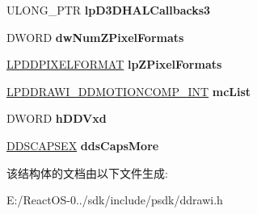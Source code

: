 \begin{DoxyCompactItemize}
\item 
\mbox{\label{struct___d_d_r_a_w_i___d_i_r_e_c_t_d_r_a_w___g_b_l_a2e05df6fe4aae33a03b52f574b7878ac}} 
U\+L\+O\+N\+G\+\_\+\+P\+TR {\bfseries lp\+D3\+D\+H\+A\+L\+Callbacks3}
\item 
\mbox{\label{struct___d_d_r_a_w_i___d_i_r_e_c_t_d_r_a_w___g_b_l_af3b24ccbcff100c01ac05c7971dd1ade}} 
D\+W\+O\+RD {\bfseries dw\+Num\+Z\+Pixel\+Formats}
\item 
\mbox{\label{struct___d_d_r_a_w_i___d_i_r_e_c_t_d_r_a_w___g_b_l_aa7c0ca948e394924854bcca99b753a34}} 
\hyperlink{interfacevoid}{L\+P\+D\+D\+P\+I\+X\+E\+L\+F\+O\+R\+M\+AT} {\bfseries lp\+Z\+Pixel\+Formats}
\item 
\mbox{\label{struct___d_d_r_a_w_i___d_i_r_e_c_t_d_r_a_w___g_b_l_aef4cf06888e4779fcae88e0a73acff5a}} 
\hyperlink{struct___d_d_r_a_w_i___d_d_m_o_t_i_o_n_c_o_m_p___i_n_t}{L\+P\+D\+D\+R\+A\+W\+I\+\_\+\+D\+D\+M\+O\+T\+I\+O\+N\+C\+O\+M\+P\+\_\+\+I\+NT} {\bfseries mc\+List}
\item 
\mbox{\label{struct___d_d_r_a_w_i___d_i_r_e_c_t_d_r_a_w___g_b_l_a18e2bf95b4920198dc0bbc5e585347b9}} 
D\+W\+O\+RD {\bfseries h\+D\+D\+Vxd}
\item 
\mbox{\label{struct___d_d_r_a_w_i___d_i_r_e_c_t_d_r_a_w___g_b_l_a958242d9c1e6f94f9875255ee0c384de}} 
\hyperlink{struct___d_d_s_c_a_p_s_e_x}{D\+D\+S\+C\+A\+P\+S\+EX} {\bfseries dds\+Caps\+More}
\end{DoxyCompactItemize}


该结构体的文档由以下文件生成\+:\begin{DoxyCompactItemize}
\item 
E\+:/\+React\+O\+S-\/0../sdk/include/psdk/ddrawi.\+h\end{DoxyCompactItemize}
